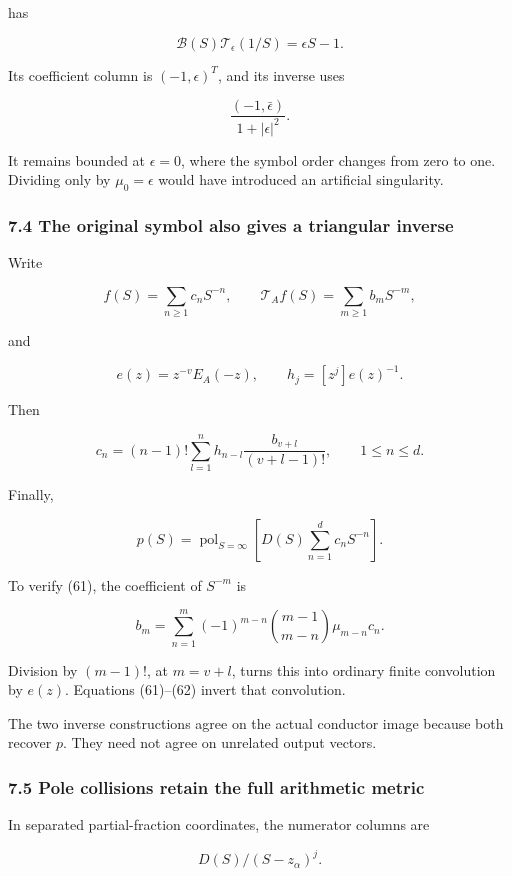 \documentclass[11pt]{article}
\begin{document}
has

\[
\mathcal B(S)\mathcal T_\epsilon(1/S)=\epsilon S-1.
\]

Its coefficient column is \((-1,\epsilon)^T\), and its inverse uses

\[
\frac{(-1,\bar\epsilon)}{1+|\epsilon|^2}.
\]

It remains bounded at \(\epsilon=0\), where the symbol order changes from zero to one. Dividing only by \(\mu_0=\epsilon\) would have introduced an artificial singularity.

\subsubsection{7.4 The original symbol also gives a triangular inverse}\label{the-original-symbol-also-gives-a-triangular-inverse}

Write

\[
f(S)=\sum_{n\ge1}c_nS^{-n},
\qquad
\mathcal T_Af(S)=\sum_{m\ge1}b_mS^{-m},
\]

and

\[
e(z)=z^{-v}E_A(-z),\qquad
h_j=[z^j]e(z)^{-1}.
\]

Then

\[
\boxed{
c_n
=
(n-1)!
\sum_{l=1}^{n}
h_{n-l}\frac{b_{v+l}}{(v+l-1)!},
\qquad1\le n\le d.
}
\tag{61}
\]

Finally,

\[
\boxed{
p(S)=
\operatorname{pol}_{S=\infty}
\left[D(S)\sum_{n=1}^{d}c_nS^{-n}\right].
}
\tag{62}
\]

To verify (61), the coefficient of \(S^{-m}\) is

\[
b_m
=
\sum_{n=1}^{m}
(-1)^{m-n}
\binom{m-1}{m-n}\mu_{m-n}c_n.
\]

Division by \((m-1)!\), at \(m=v+l\), turns this into ordinary finite convolution by \(e(z)\). Equations (61)--(62) invert that convolution.

The two inverse constructions agree on the actual conductor image because both recover \(p\). They need not agree on unrelated output vectors.

\subsubsection{7.5 Pole collisions retain the full arithmetic metric}\label{pole-collisions-retain-the-full-arithmetic-metric}

In separated partial-fraction coordinates, the numerator columns are

\[
D(S)/(S-z_\alpha)^j.
\]
\end{document}
